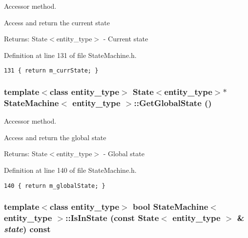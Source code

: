 Accessor method. 

Access and return the current state

\begin{Desc}
\item[Returns:]State$<$entity\_\-type$>$ - Current state \end{Desc}


Definition at line 131 of file StateMachine.h.

\begin{Code}\begin{verbatim}131 { return m_currState; }
\end{verbatim}
\end{Code}


\hypertarget{class_state_machine_35d0fd48873e42d21b309c1bfa7f83a3}{
\subsubsection[GetGlobalState]{\setlength{\rightskip}{0pt plus 5cm}template$<$class entity\_\-type$>$ {\bf State}$<$entity\_\-type$>$$\ast$ {\bf StateMachine}$<$ entity\_\-type $>$::GetGlobalState ()}}
\label{class_state_machine_35d0fd48873e42d21b309c1bfa7f83a3}


Accessor method. 

Access and return the global state

\begin{Desc}
\item[Returns:]State$<$entity\_\-type$>$ - Global state \end{Desc}


Definition at line 140 of file StateMachine.h.

\begin{Code}\begin{verbatim}140 { return m_globalState; }
\end{verbatim}
\end{Code}


\hypertarget{class_state_machine_cc3b506f626a27632bebbdae15276650}{
\subsubsection[IsInState]{\setlength{\rightskip}{0pt plus 5cm}template$<$class entity\_\-type$>$ bool {\bf StateMachine}$<$ entity\_\-type $>$::IsInState (const {\bf State}$<$ entity\_\-type $>$ \& {\em state}) const}}
\label{class_state_machine_cc3b506f626a27632bebbdae15276650}


